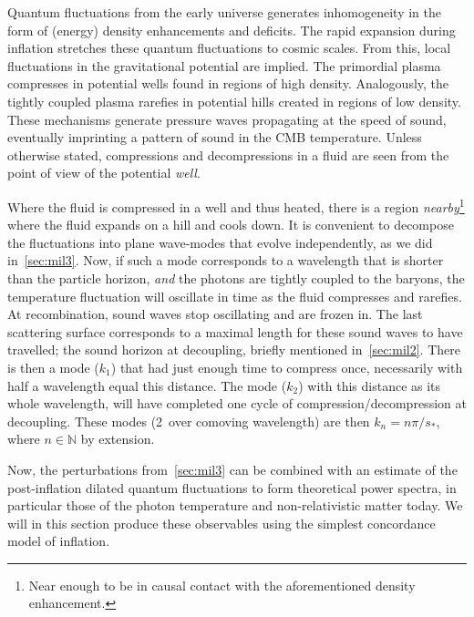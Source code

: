 


Quantum fluctuations from the early universe generates inhomogeneity in the form of (energy) density enhancements and deficits. The rapid expansion during inflation stretches these quantum fluctuations to cosmic scales. From this, local fluctuations in the gravitational potential are implied. The primordial plasma compresses in potential wells found in regions of high density. Analogously, the tightly coupled plasma rarefies in potential hills created in regions of low density. These mechanisms generate pressure waves propagating at the speed of sound, eventually imprinting a pattern of sound in the CMB temperature. Unless otherwise stated, compressions and decompressions in a fluid are seen from the point of view of the potential \emph{well}.

Where the fluid is compressed in a well and thus heated, there is a region \emph{nearby}\footnote{Near enough to be in causal contact with the aforementioned density enhancement.} where the fluid expands on a hill and cools down. It is convenient to decompose the fluctuations into plane wave-modes that evolve independently, as we did in~\cref{sec:mil3}. Now, if such a mode corresponds to a wavelength that is shorter than the particle horizon, \emph{and} the photons are tightly coupled to the baryons, the temperature fluctuation will oscillate in time as the fluid compresses and rarefies. At recombination, sound waves stop oscillating and are frozen in. The last scattering surface corresponds to a maximal length for these sound waves to have travelled; the sound horizon at decoupling, briefly mentioned in~\cref{sec:mil2}. There is then a mode ($k_1$) that had just enough time to compress once, necessarily with half a wavelength equal this distance. The mode ($k_2$) with this distance as its whole wavelength, will have completed one cycle of compression/decompression at decoupling. These modes (2\textpi~over comoving wavelength) are then $k_n=n\pi/s_*$, where $n\in \mathbb{N}$ by extension.

Now, the perturbations from~\cref{sec:mil3} can be combined with an estimate of the post-inflation dilated quantum fluctuations to form theoretical power spectra, in particular those of the photon temperature and non-relativistic matter today. We will in this section produce these observables using the simplest concordance model of inflation. 

